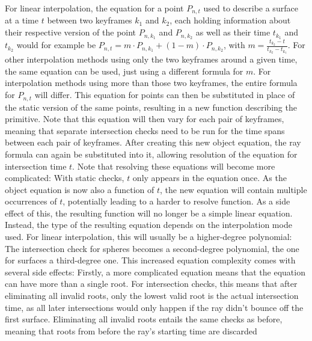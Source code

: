 For linear interpolation,
the equation for a point \(P_{n, t}\) used to describe a surface at a time \(t\) between two keyframes \(k_1\) and \(k_2\),
each holding information about their respective version of the point \(P_{n, k_1}\) and \(P_{n, k_2}\)
as well as their time \(t_{k_1}\) and \(t_{k_2}\)
would for example be \(P_{n, t} = m \cdot P_{n, k_1} + (1-m) \cdot P_{n, k_2}\),
with \(m = \frac{t_{k_2} - t}{t_{k_2} - t_{k_1}}\).
For other interpolation methods using only the two keyframes around a given time,
the same equation can be used, just using a different formula for \(m\).
For interpolation methods using more than those two keyframes,
the entire formula for \(P_{n, t}\) will differ.
\newline
This equation for points can then be substituted in place of the static version of the same points,
resulting in a new function describing the primitive.
Note that this equation will then vary for each pair of keyframes,
meaning that separate intersection checks need to be run for the time spans between each pair of keyframes.
\newline
After creating this new object equation, the ray formula can again be substituted into it,
allowing resolution of the equation for intersection time \(t\).
Note that resolving these equations will become more complicated:
With static checks, \(t\) only appears in the equation once.
As the object equation is now also a function of \(t\),
the new equation will contain multiple occurrences of \(t\),
potentially leading to a harder to resolve function.
\newline
As a side effect of this,
the resulting function will no longer be a simple linear equation.
Instead, the type of the resulting equation depends on the interpolation mode used.
For linear interpolation, this will usually be a higher-degree polynomial:
The intersection check for spheres becomes a second-degree polynomial,
the one for surfaces a third-degree one.
\newline
This increased equation complexity comes with several side effects:
Firstly, a more complicated equation means that the equation can have more than a single root.
For intersection checks, this means that after eliminating all invalid roots,
only the lowest valid root is the actual intersection time,
as all later intersections would only happen if the ray didn't bounce off the first surface.
\newline
Eliminating all invalid roots entails the same checks as before,
meaning that roots from before the ray's starting time are discarded
